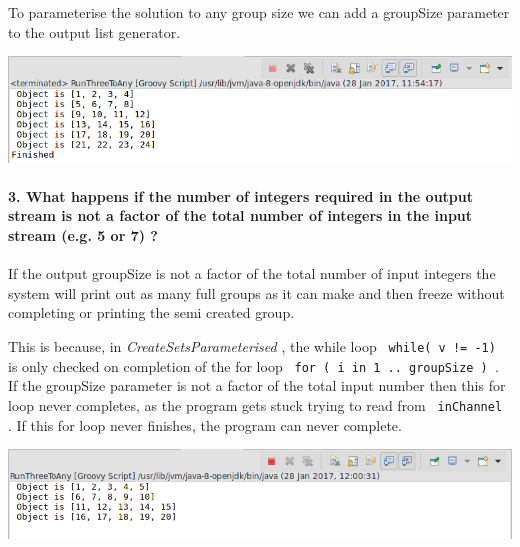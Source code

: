 To parameterise the solution to any group size we can add a groupSize parameter to the output list generator.



\includegraphics[width=\textwidth]{img/screenshots/2-2-q2.png}

\paragraph{3. What happens if the number of integers required in the output stream is not a factor of the total number of integers in the input stream (e.g. 5 or 7) ?}

If the output groupSize is not a factor of the total number of input integers the system will print out as many full groups as it can make and then freeze without completing or printing the semi created group.

This is because, in {\em CreateSetsParameterised }, the while loop \texttt{ while( v != -1) } is only checked on completion of the for loop \texttt{ for ( i in 1 .. groupSize ) }.  If the groupSize parameter is not a factor of the total input number then this for loop never completes, as the program gets stuck trying to read from \texttt{ inChannel }.  If this for loop never finishes, the program can never complete.

\includegraphics[width=\textwidth]{img/screenshots/2-2-q3.png}
